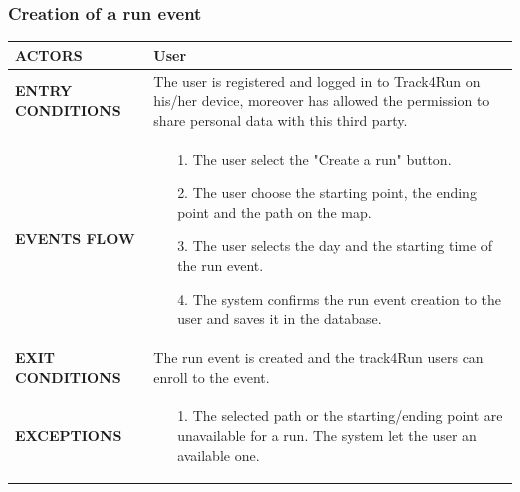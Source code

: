 \documentclass[a4paper]{article}
\begin{document}
\vspace{1cm}

\subsubsection{Creation of a run event}
\begin{center}
    \begin{tabular}{l || p{8cm} ||}
        \bf{ACTORS} & User \\ \hline
        \bf{ENTRY CONDITIONS} & The user is registered and logged in to Track4Run on his/her device, moreover has allowed the permission to share personal data with this third party.  \\ \hline
        \bf{EVENTS FLOW} & \begin{itemize}[noitemsep, topsep=0cm, leftmargin=*] \vspace{-0.2cm}
            \item[1.] The user select the "Create a run" button.
            \item[2.] The user choose the starting point, the ending point and the path on the map.
            \item[3.] The user selects the day and the starting time of the run event.
            \item[4.] The system confirms the run event creation to the user and saves it in the database.
        \end{itemize}
        \\ \hline
        \bf{EXIT CONDITIONS} & The run event is created and the track4Run users can enroll to the event.\\ \hline
        \bf{EXCEPTIONS} & \begin{itemize}[noitemsep, topsep=0cm, leftmargin=*] \vspace{-0.2cm}
            \item[1.] The selected path or the starting/ending point are unavailable for a run. The system let the user an available one.
        \end{itemize}
        \\ \hline \hline
    \end{tabular}
\end{center}

\vspace{1cm}
\end{document}
